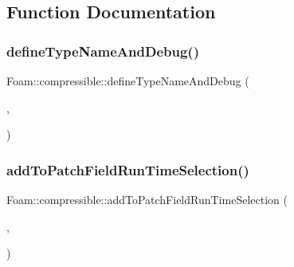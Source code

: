 \subsection{Function Documentation}
\mbox{\label{namespaceFoam_1_1compressible_a24b0ca5e01315f9f3189f5f84f7bc59f}} 
\subsubsection{\texorpdfstring{define\+Type\+Name\+And\+Debug()}{defineTypeNameAndDebug()}}
{\footnotesize\ttfamily Foam\+::compressible\+::define\+Type\+Name\+And\+Debug (\begin{DoxyParamCaption}\item[{\hyperlink{classFoam_1_1compressible_1_1NusseltThermalBaffle1DFvPatchScalarField}{Nusselt\+Thermal\+Baffle1\+D\+Fv\+Patch\+Scalar\+Field}}]{,  }\item[{0}]{ }\end{DoxyParamCaption})}

\mbox{\label{namespaceFoam_1_1compressible_aa0ae99239c75310cdeeb4a90ed2a4407}} 
\subsubsection{\texorpdfstring{add\+To\+Patch\+Field\+Run\+Time\+Selection()}{addToPatchFieldRunTimeSelection()}}
{\footnotesize\ttfamily Foam\+::compressible\+::add\+To\+Patch\+Field\+Run\+Time\+Selection (\begin{DoxyParamCaption}\item[{fv\+Patch\+Scalar\+Field}]{,  }\item[{\hyperlink{classFoam_1_1compressible_1_1NusseltThermalBaffle1DFvPatchScalarField}{Nusselt\+Thermal\+Baffle1\+D\+Fv\+Patch\+Scalar\+Field}}]{ }\end{DoxyParamCaption})}

